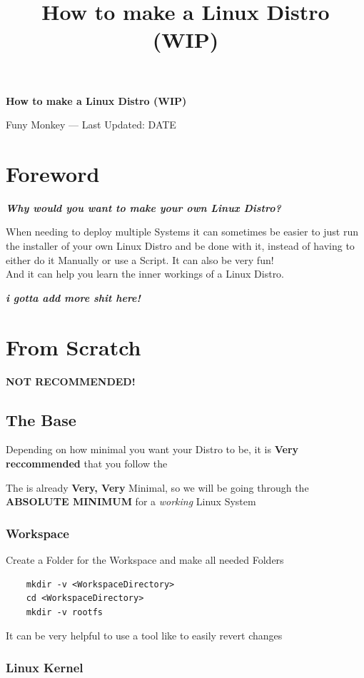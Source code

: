 \documentclass{article}
\title{How to make a Linux Distro (WIP)}
\renewcommand{\maketitle}{
	\begin{center}
		{\huge\bfseries
		How to make a Linux Distro (WIP)}
		\vspace{.25em}

		Funy Monkey --- Last Updated: DATE 
	\end{center}
}
\begin{document}
\maketitle
\tableofcontents

\section{Foreword}
	\textit{\textbf{Why would you want to make your own Linux Distro?}}

	When needing to deploy multiple Systems it can sometimes be easier to just run the installer of your own Linux Distro and be done with it, instead of having to either do it Manually or use a Script. It can also be very fun!
	\\And it can help you learn the inner workings of a Linux Distro.

	\textit{\textbf{i gotta add more shit here!}}

\section{From Scratch}
\label{Scratch}
\textbf{NOT RECOMMENDED!}
\subsection{The Base}
	\label{ScratchBase}
	Depending on how minimal you want your Distro to be, it is \textbf{Very reccommended} that you follow the 

	The  is already \textbf{Very, Very} Minimal, so we will be going through the \textbf{ABSOLUTE MINIMUM} for a \textit{working} Linux System 
		\subsubsection{Workspace}
			Create a Folder for the Workspace and make all needed Folders
			
			\begin{lstlisting}
	mkdir -v <WorkspaceDirectory>
	cd <WorkspaceDirectory>
	mkdir -v rootfs
			\end{lstlisting}

			It can be very helpful to use a tool like  to easily revert changes
		\subsubsection{Linux Kernel}
\end{document}
